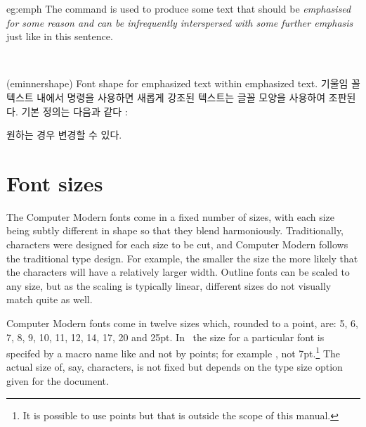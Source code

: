 \begin{egresult}{eg:emph}
The \cmd{\emph} command is used to produce some text that 
should be \emph{emphasised for some reason and can be
\emph{infrequently interspersed} with some further emphasis} 
just like in this sentence.
\end{egresult}


\begin{syntax}
\cmd{\eminnershape} \\
\end{syntax}
\glossary(eminnershape)%
  {}%
  {Font shape for emphasized text within emphasized text.}%
기울임 꼴 텍스트 내에서 \cmd{\emph} 명령을 사용하면 새롭게 강조된 텍스트는 \cmd{\eminnershape} 글꼴 모양을 사용하여 조판된다.
기본 정의는 다음과 같다 : 
\begin{lcode}
\newcommand*{\eminnershape}{\upshape}
\end{lcode}
원하는 경우 변경할 수 있다.



\section{Font sizes}

    The Computer Modern \metafont{} fonts come in a fixed number of 
sizes, with
each size being subtly different in shape so that they blend harmoniously.
Traditionally, characters were designed for each size to be cut, and
Computer Modern follows the traditional type design. For example, the smaller
the size the more likely that the characters will have a relatively larger
width.
Outline fonts can be scaled to any size, 
but as the scaling is typically 
linear, different sizes do not visually match quite as well.

    Computer Modern fonts come in twelve sizes which, rounded to a point,
are: 5, 6, 7, 8, 9, 10, 11, 12, 14, 17, 20 and 25pt.
   In \ltx\ the size for a particular font is specifed by a macro name like
 and not by points; for example , not 
7pt.\footnote{It is possible to use points but that is outside the scope
of this manual.} 
The actual size of, say,  characters, is not fixed but depends
on the type size option given for the document. 

